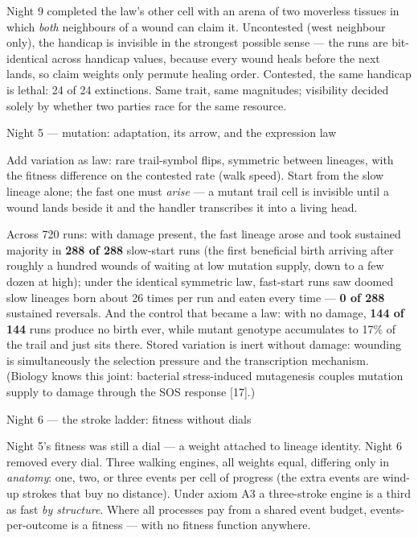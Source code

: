 Night 9 completed the law's other cell with an arena of two
moverless tissues in which {\it both} neighbours of a wound can
claim it. Uncontested (west neighbour only), the handicap is
invisible in the strongest possible sense --- the runs are
bit-identical across handicap values, because every wound heals
before the next lands, so claim weights only permute healing
order. Contested, the same handicap is lethal: 24 of 24
extinctions. Same trait, same magnitudes; visibility decided
solely by whether two parties race for the same resource.

\secc Night 5 --- mutation: adaptation, its arrow, and the expression law

Add variation as law: rare trail-symbol flips, symmetric between
lineages, with the fitness difference on the contested rate (walk
speed). Start from the slow lineage alone; the fast one must {\it
arise} --- a mutant trail cell is invisible until a wound lands
beside it and the handler transcribes it into a living head.

Across 720 runs: with damage present, the fast lineage arose and
took sustained majority in {\bf 288 of 288} slow-start runs (the
first beneficial birth arriving after roughly a hundred wounds of
waiting at low mutation supply, down to a few dozen at high); under
the identical symmetric law, fast-start runs saw doomed slow
lineages born about 26 times per run and eaten every time --- {\bf
0 of 288} sustained reversals. And the control that became a law:
with no damage, {\bf 144 of 144} runs produce no birth ever, while
mutant genotype accumulates to 17\% of the trail and just sits
there.  Stored variation is inert without damage:
wounding is simultaneously the selection pressure and the
transcription mechanism. (Biology knows this joint: bacterial
stress-induced mutagenesis couples mutation supply to damage
through the SOS response [17].)

\secc Night 6 --- the stroke ladder: fitness without dials

Night 5's fitness was still a dial --- a weight attached to lineage
identity. Night 6 removed every dial. Three walking engines, all
weights equal, differing only in {\it anatomy}: one, two, or three
events per cell of progress (the extra events are wind-up strokes
that buy no distance). Under axiom A3 a three-stroke engine is a
third as fast {\it by structure}.  Where all processes
pay from a shared event budget, events-per-outcome is a fitness ---
with no fitness function anywhere.

